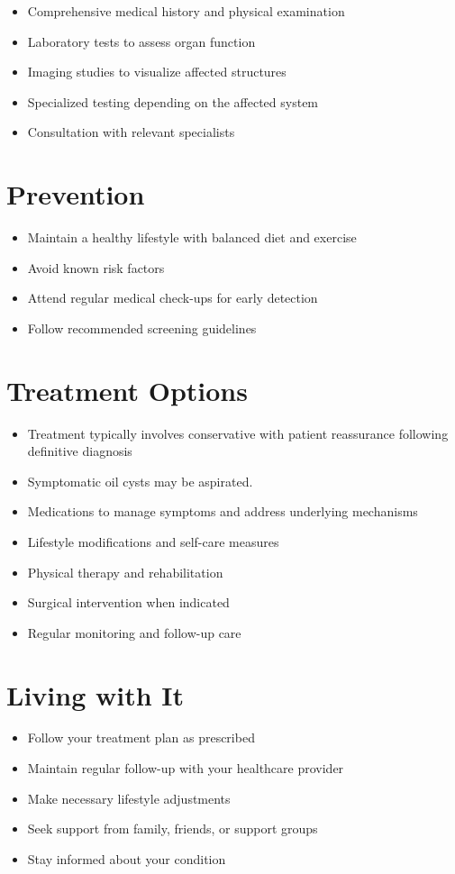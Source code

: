 \begin{itemize}[noitemsep]
  \item Comprehensive medical history and physical examination
  \item Laboratory tests to assess organ function
  \item Imaging studies to visualize affected structures
  \item Specialized testing depending on the affected system
  \item Consultation with relevant specialists
\end{itemize}
\section{Prevention}
\begin{itemize}[noitemsep]
  \item Maintain a healthy lifestyle with balanced diet and exercise
  \item Avoid known risk factors
  \item Attend regular medical check-ups for early detection
  \item Follow recommended screening guidelines
\end{itemize}
\section{Treatment Options}
\begin{itemize}[noitemsep]
  \item Treatment typically involves conservative with patient reassurance following definitive diagnosis
  \item Symptomatic oil cysts may be aspirated.
  \item Medications to manage symptoms and address underlying mechanisms
  \item Lifestyle modifications and self-care measures
  \item Physical therapy and rehabilitation
  \item Surgical intervention when indicated
  \item Regular monitoring and follow-up care
\end{itemize}
\section{Living with It}
\begin{itemize}[noitemsep]
  \item Follow your treatment plan as prescribed
  \item Maintain regular follow-up with your healthcare provider
  \item Make necessary lifestyle adjustments
  \item Seek support from family, friends, or support groups
  \item Stay informed about your condition
\end{itemize}
